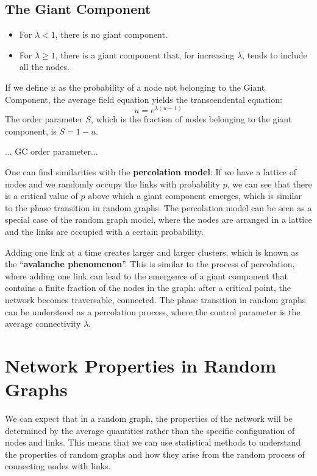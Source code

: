 \subsection{The Giant Component}
\begin{definition}
    \begin{itemize}
        \item For $\lambda < 1$, there is no giant component.
        \item For $\lambda \ge 1$, there is a giant component that, for increasing $\lambda$, tends to include all the nodes.
    \end{itemize}
\end{definition}

\begin{remark}
    If we define $u$ as the probability of a node not belonging to the Giant Component, the average field equation yields the transcendental equation:
    $$ u = e^{\lambda(u-1)} $$
    The order parameter $S$, which is the fraction of nodes belonging to the giant component, is $S = 1 - u$.
\end{remark}
...
GC order parameter...

One can find similarities with the \textbf{percolation model}: If we have a lattice of nodes and we randomly occupy the links with probability $p$, we can see that there is a critical value of $p$ above which a giant component emerges, which is similar to the phase transition in random graphs. The percolation model can be seen as a special case of the random graph model, where the nodes are arranged in a lattice and the links are occupied with a certain probability.

Adding one link at a time creates larger and larger clusters, which is known as the ``\textbf{avalanche phenomenon}''. This is similar to the process of percolation, where adding one link can lead to the emergence of a giant component that contains a finite fraction of the nodes in the graph: after a critical point, the network becomes traversable, connected. The phase transition in random graphs can be understood as a percolation process, where the control parameter is the average connectivity $\lambda$.


\section{Network Properties in Random Graphs}

We can expect that in a random graph, the properties of the network will be determined by the average quantities rather than the specific configuration of nodes and links. This means that we can use statistical methods to understand the properties of random graphs and how they arise from the random process of connecting nodes with links.

